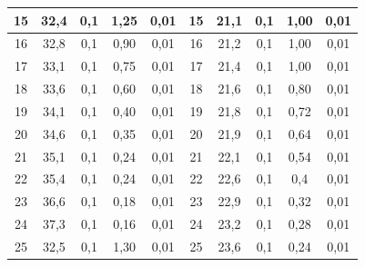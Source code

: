 \documentclass[a4paper,12pt]{article}
\begin{document}
\begin{enumerate}
\begin{table}[h]
\begin{tabular}{ccccc||c|c|c|c|c|}
\multicolumn{1}{|c|}{15}  & \multicolumn{1}{c|}{32,4}     & \multicolumn{1}{c|}{0,1}             & \multicolumn{1}{c|}{1,25}   & 0,01                  & 15  & 21,1   & 0,1             & 1,00 & 0,01          \\ \hline
\multicolumn{1}{|c|}{16}  & \multicolumn{1}{c|}{32,8}     & \multicolumn{1}{c|}{0,1}             & \multicolumn{1}{c|}{0,90}   & 0,01                  & 16  & 21,2   & 0,1             & 1,00 & 0,01          \\ \hline
\multicolumn{1}{|c|}{17}  & \multicolumn{1}{c|}{33,1}     & \multicolumn{1}{c|}{0,1}             & \multicolumn{1}{c|}{0,75}   & 0,01                  & 17  & 21,4   & 0,1             & 1,00 & 0,01          \\ \hline
\multicolumn{1}{|c|}{18}  & \multicolumn{1}{c|}{33,6}     & \multicolumn{1}{c|}{0,1}             & \multicolumn{1}{c|}{0,60}   & 0,01                  & 18  & 21,6   & 0,1             & 0,80 & 0,01          \\ \hline
\multicolumn{1}{|c|}{19}  & \multicolumn{1}{c|}{34,1}     & \multicolumn{1}{c|}{0,1}             & \multicolumn{1}{c|}{0,40}   & 0,01                  & 19  & 21,8   & 0,1             & 0,72 & 0,01          \\ \hline
\multicolumn{1}{|c|}{20}  & \multicolumn{1}{c|}{34,6}     & \multicolumn{1}{c|}{0,1}             & \multicolumn{1}{c|}{0,35}   & 0,01                  & 20  & 21,9   & 0,1             & 0,64 & 0,01          \\ \hline
\multicolumn{1}{|c|}{21}  & \multicolumn{1}{c|}{35,1}     & \multicolumn{1}{c|}{0,1}             & \multicolumn{1}{c|}{0,24}   & 0,01                  & 21  & 22,1   & 0,1             & 0,54 & 0,01          \\ \hline
\multicolumn{1}{|c|}{22}  & \multicolumn{1}{c|}{35,4}     & \multicolumn{1}{c|}{0,1}             & \multicolumn{1}{c|}{0,24}   & 0,01                  & 22  & 22,6   & 0,1             & 0,4  & 0,01          \\ \hline
\multicolumn{1}{|c|}{23}  & \multicolumn{1}{c|}{36,6}     & \multicolumn{1}{c|}{0,1}             & \multicolumn{1}{c|}{0,18}   & 0,01                  & 23  & 22,9   & 0,1             & 0,32 & 0,01          \\ \hline
\multicolumn{1}{|c|}{24}  & \multicolumn{1}{c|}{37,3}     & \multicolumn{1}{c|}{0,1}             & \multicolumn{1}{c|}{0,16}   & 0,01                  & 24  & 23,2   & 0,1             & 0,28 & 0,01          \\ \hline
\multicolumn{1}{|c|}{25}  & \multicolumn{1}{c|}{32,5}     & \multicolumn{1}{c|}{0,1}             & \multicolumn{1}{c|}{1,30}   & 0,01                  & 25  & 23,6   & 0,1             & 0,24 & 0,01          \\ \hline

\end{tabular}
\end{table}
\end{enumerate}
\end{document}
